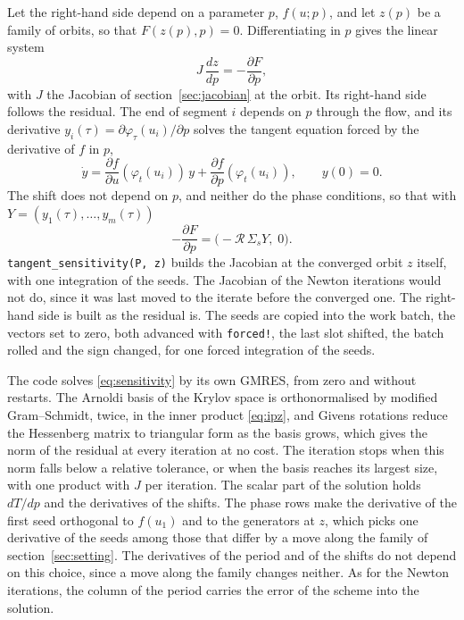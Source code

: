 \documentclass[11pt,a4paper]{article}
\newcommand{\roll}{\mathcal{R}}
\newcommand{\code}[1]{\texttt{#1}}
\begin{document}
Let the right-hand side depend on a parameter $p$, $f(u; p)$, and let $z(p)$ be a family of
orbits, so that $F(z(p), p) = 0$. Differentiating in $p$ gives the linear system
\begin{equation}
  J\, \frac{dz}{dp} = -\frac{\partial F}{\partial p},
  \label{eq:sensitivity}
\end{equation}
with $J$ the Jacobian of section~\ref{sec:jacobian} at the orbit. Its right-hand side follows the
residual. The end of segment $i$ depends on $p$ through the flow, and its derivative $y_i(\tau) =
\partial \varphi_\tau(u_i) / \partial p$ solves the tangent equation forced by the derivative of
$f$ in $p$,
\begin{equation}
  \dot y = \frac{\partial f}{\partial u}(\varphi_t(u_i))\, y + \frac{\partial f}{\partial p}(\varphi_t(u_i)),
  \qquad y(0) = 0 .
\end{equation}
The shift does not depend on $p$, and neither do the phase conditions, so that with $Y = (y_1(\tau),
\dots, y_m(\tau))$
\begin{equation}
  -\frac{\partial F}{\partial p} = \big(-\roll\, \Sigma_s Y,\; 0\big).
\end{equation}
\code{tangent\_sensitivity(P, z)} builds the Jacobian at the converged orbit $z$ itself, with one
integration of the seeds. The Jacobian of the Newton iterations would not do, since it was last
moved to the iterate before the converged one. The right-hand side is built as the residual is.
The seeds are copied into the work batch, the vectors set to zero, both advanced with
\code{forced!}, the last slot shifted, the batch rolled and the sign changed, for one forced
integration of the seeds.

The code solves \eqref{eq:sensitivity} by its own GMRES, from zero and without restarts. The
Arnoldi basis of the Krylov space is orthonormalised by modified Gram--Schmidt, twice, in the
inner product \eqref{eq:ipz}, and Givens rotations reduce the Hessenberg matrix to triangular form
as the basis grows, which gives the norm of the residual at every iteration at no cost. The
iteration stops when this norm falls below a relative tolerance, or when the basis reaches its
largest size, with one product with $J$ per iteration. The scalar part of the solution holds
$dT/dp$ and the derivatives of the shifts.
The phase rows make the derivative of the first seed orthogonal to $f(u_1)$ and to the
generators at $z$, which picks one derivative of the seeds among those that differ by a move
along the family of section~\ref{sec:setting}. The derivatives of the period and of the shifts do
not depend on this choice, since a move along the family changes neither. As for the Newton iterations, the column of
the period carries the error of the scheme into the solution.
\end{document}
